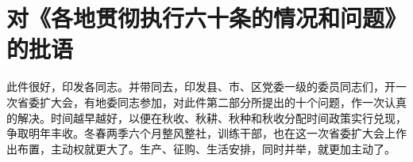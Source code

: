 \section[对《各地贯彻执行六十条的情况和问题》的批语（一九六一年九月六日）]{对《各地贯彻执行六十条的情况和问题》的批语}

此件很好，印发各同志。并带同去，印发县、市、区党委一级的委员同志们，开一次省委扩大会，有地委同志参加，对此件第二部分所提出的十个问题，作一次认真的解决。时间越早越好，以便在秋收、秋耕、秋种和秋收分配时间政策实行兑现，争取明年丰收。冬春两季六个月整风整社，训练干部，也在这一次省委扩大会上作出布置，主动权就更大了。生产、征购、生活安排，同时并举，就更加主动了。
